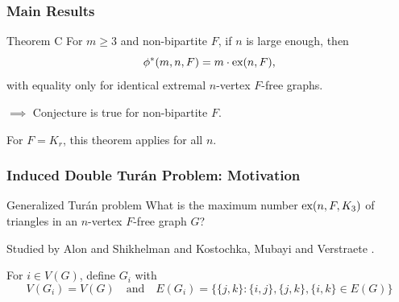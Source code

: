 \documentclass{beamer}
\newcommand*{\ex}{\textnormal{ex}}
\begin{document}
\begin{frame}
  \frametitle{Main Results}


  \begin{block}{Theorem C}
    For $m \geq 3$ and non-bipartite $F$, if $n$ is large enough, then
    \[
      \phi^*(m, n, F) = m \cdot \ex(n, F),
    \]
    with equality only for identical extremal $n$-vertex $F$-free graphs.
  \end{block}

  \pause

  $\implies$ Conjecture is true for non-bipartite $F$.

  \pause

  \vspace{0.5cm}

  For $F = K_r$, this theorem applies for all $n$.
\end{frame}

\begin{frame}
  \frametitle{Induced Double Turán Problem: Motivation}

  \begin{block}{Generalized Turán problem}
    What is the maximum number $\ex(n, F, K_3)$ of triangles in an $n$-vertex $F$-free graph $G$?
  \end{block}

  Studied by Alon and Shikhelman \cite{AlonShikhelman2016} and Kostochka, Mubayi and Verstraete \cite{KostochkaMubayiV2015,MubayiMukherjee2023,MubayiV2016}.

  \pause 

  \vspace{0.7cm}

  For $i \in V(G)$, define $G_i$ with
  \[
    V(G_i) = V(G) \quad \text{and} \quad E(G_i) = \{\{j, k\} : \{i, j\}, \{j, k\}, \{i, k\} \in E(G)\}
  \]
\end{frame}
\end{document}
